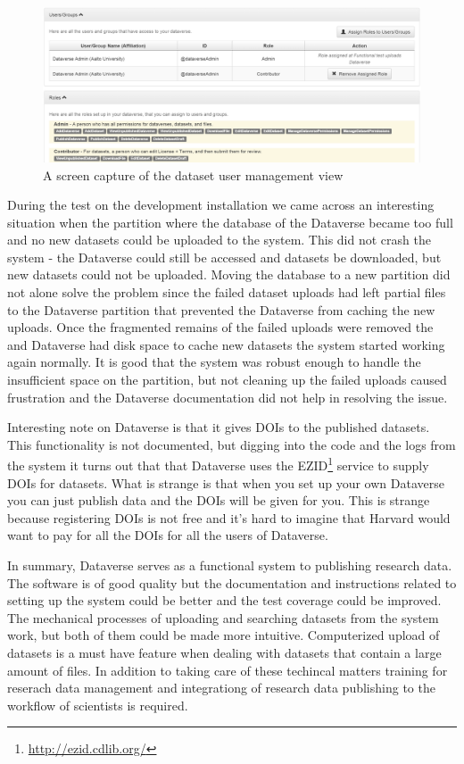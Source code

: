 \begin{figure}
    \begin{centering}
        \includegraphics[width=\textwidth]{images/admin}
    \end{centering}
    \caption{A screen capture of the dataset user management view}
    \label{fig:admin}
\end{figure}

During the test on the development installation we came across an interesting
situation when the partition where the database of the Dataverse became too
full and no new datasets could be uploaded to the system. This did not crash
the system - the Dataverse could still be accessed and datasets be downloaded,
but new datasets could not be uploaded. Moving the database to a new partition
did not alone solve the problem since the failed dataset uploads had left
partial files to the Dataverse partition that prevented the Dataverse from
caching the new uploads. Once the fragmented remains of the failed uploads
were removed the and Dataverse had disk space to cache new datasets the system
started working again normally. It is good that the system was robust enough
to handle the insufficient space on the partition, but not cleaning up the
failed uploads caused frustration and the Dataverse documentation did not
help in resolving the issue.

Interesting note on Dataverse is that it gives DOIs to the published datasets.
This functionality is not documented, but digging into the code and the logs
from the system it turns out that that Dataverse uses the
EZID\footnote{\url{http://ezid.cdlib.org/}} service to supply DOIs for
datasets. What is strange is that when you set up your own Dataverse you
can just publish data and the DOIs will be given for you. This is strange
because registering DOIs is not free and it's hard to imagine that Harvard
would want to pay for all the DOIs for all the users of Dataverse.

In summary, Dataverse serves as a functional system to publishing research
data. The software is of good quality but the documentation and instructions
related to setting up the system could be better and the test coverage could be
improved. The mechanical processes of
uploading and searching datasets from the system work, but both of them could
be made more intuitive. Computerized upload of datasets is a must have feature
when dealing with datasets that contain a large amount of files. In addition to
taking care of these techincal matters training for reserach data management
and integrationg of research data publishing to the workflow of scientists is
required.

